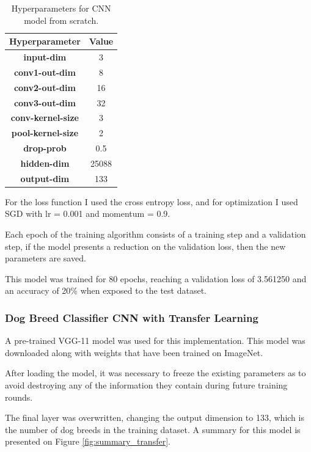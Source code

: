 \documentclass{article}
\begin{document}
    \begin{table}[htbp]
        \centering
        \begin{tabular}{c|c}
             \textbf{Hyperparameter} & \textbf{Value} \\
            \hline
            \textbf{input-dim} & 3 \\
            \textbf{conv1-out-dim} & 8 \\
            \textbf{conv2-out-dim} & 16 \\
            \textbf{conv3-out-dim} & 32 \\
            \textbf{conv-kernel-size} & 3 \\
            \textbf{pool-kernel-size} & 2 \\
            \textbf{drop-prob} & 0.5 \\
            \textbf{hidden-dim} & 25088 \\
            \textbf{output-dim} & 133 \\
        \end{tabular}
        \caption{Hyperparameters for CNN model from scratch.}
        \label{tab:scratch_hyperparameters}
    \end{table}

    For the loss function I used the cross entropy loss, and for optimization I used SGD with lr = 0.001 and momentum = 0.9.

    Each epoch of the training algorithm consists of a training step and a validation step, if the model presents a reduction on the validation loss, then the new parameters are saved.

    This model was trained for 80 epochs, reaching a validation loss of 3.561250 and an accuracy of 20\% when exposed to the test dataset.

    \subsubsection{Dog Breed Classifier CNN with Transfer Learning}

    A pre-trained VGG-11 model was used for this implementation. This model was downloaded along with weights that have been trained on ImageNet.

    After loading the model, it was necessary to freeze the existing parameters as to avoid destroying any of the information they contain during future training rounds.
    
    The final layer was overwritten, changing the output dimension to 133, which is the number of dog breeds in the training dataset. A summary for this model is presented on Figure \ref{fig:summary_transfer}.
\end{document}
